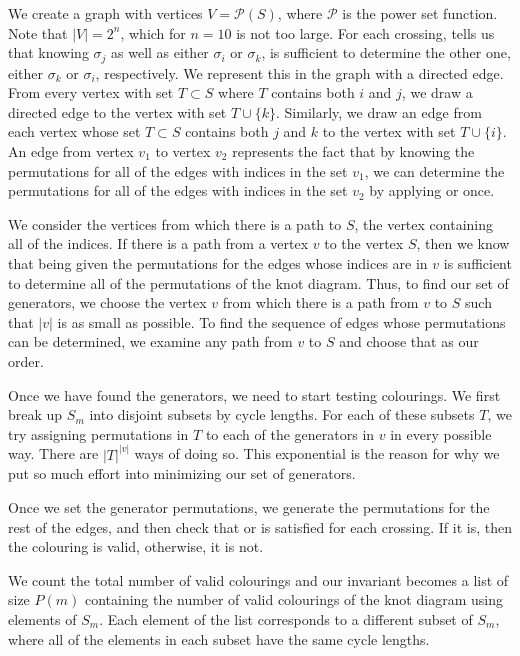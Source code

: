 \begin{paper}
We create a graph with vertices $V=\mathcal{P}(S)$, where $\mathcal{P}$ is the
power set function.
Note that $|V|=2^n$, which for $n=10$ is not too large.
For each crossing, \eqRight tells us that knowing $\sigma_j$ as well as either
$\sigma_i$ or $\sigma_k$, is sufficient to determine the other one, either
$\sigma_k$ or $\sigma_i$, respectively.
We represent this in the graph with a directed edge.
From every vertex with set $T\subset S$ where $T$ contains both $i$ and $j$, we
draw a directed edge to the vertex with set $T\cup\{k\}$.
Similarly, we draw an edge from each vertex whose set $T\subset S$ contains both
$j$ and $k$ to the vertex with set $T\cup\{i\}$.
An edge from vertex $v_1$ to vertex $v_2$ represents the fact that by knowing
the permutations for all of the edges with indices in the set $v_1$, we can
determine the permutations for all of the edges with indices in the set $v_2$ by
applying \eqRight or \eqLeft once.

We consider the vertices from which there is a path to $S$, the vertex
containing all of the indices.
If there is a path from a vertex $v$ to the vertex $S$, then we know that being
given the permutations for the edges whose indices are in $v$ is sufficient to
determine all of the permutations of the knot diagram.
Thus, to find our set of generators, we choose the vertex $v$ from which there
is a path from $v$ to $S$ such that $|v|$ is as small as possible.
To find the sequence of edges whose permutations can be determined, we examine
any path from $v$ to $S$ and choose that as our order.


Once we have found the generators, we need to start testing colourings.
We first break up $S_m$ into disjoint subsets by cycle lengths.
For each of these subsets $T$, we try assigning permutations in $T$ to each of
the generators in $v$ in every possible way.
There are $|T|^{|v|}$ ways of doing so.
This exponential is the reason for why we put so much effort into minimizing our
set of generators.

Once we set the generator permutations, we generate the permutations for the
rest of the edges, and then check that \eqRight or \eqLeft is satisfied for each
crossing.
If it is, then the colouring is valid, otherwise, it is not.


We count the total number of valid colourings and our invariant becomes a list
of size $P(m)$ containing the number of valid colourings of the knot diagram
using elements of $S_m$.
Each element of the list corresponds to a different subset of $S_m$, where all
of the elements in each subset have the same cycle lengths.


\end{paper}
